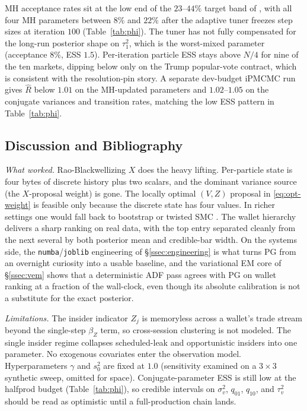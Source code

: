MH acceptance rates sit at the low end of the $23$--$44\%$ target band of \citet[Ch. 4.2.2]{sanzalonso2025notes}, with all four MH parameters between $8\%$ and $22\%$ after the adaptive tuner freezes step sizes at iteration $100$ (Table~\ref{tab:phi}). The tuner has not fully compensated for the long-run posterior shape on $\tau^2_1$, which is the worst-mixed parameter (acceptance $8\%$, ESS $1.5$). Per-iteration particle ESS stays above $N/4$ for nine of the ten markets, dipping below only on the Trump popular-vote contract, which is consistent with the resolution-pin story. A separate dev-budget iPMCMC run gives $\widehat R$ below $1.01$ on the MH-updated parameters and $1.02$--$1.05$ on the conjugate variances and transition rates, matching the low ESS pattern in Table~\ref{tab:phi}.

\subsection{Discussion and Bibliography}\label{ssec:discussion}

\emph{What worked.} Rao-Blackwellizing $X$ does the heavy lifting. Per-particle state is four bytes of discrete history plus two scalars, and the dominant variance source (the $X$-proposal weight) is gone. The locally optimal $(V,Z)$ proposal in \eqref{eq:opt-weight} is feasible only because the discrete state has four values. In richer settings one would fall back to bootstrap or twisted SMC \citep{heng2020controlled}. The wallet hierarchy delivers a sharp ranking on real data, with the top entry separated cleanly from the next several by both posterior mean and credible-bar width. On the systems side, the \texttt{numba}/\texttt{joblib} engineering of \S\ref{ssec:engineering} is what turns PG from an overnight curiosity into a usable baseline, and the variational EM core of \S\ref{ssec:vem} shows that a deterministic ADF pass agrees with PG on wallet ranking at a fraction of the wall-clock, even though its absolute calibration is not a substitute for the exact posterior.

\emph{Limitations.} The insider indicator $Z_j$ is memoryless across a wallet's trade stream beyond the single-step $\beta_Z$ term, so cross-session clustering is not modeled. The single insider regime collapses scheduled-leak and opportunistic insiders into one parameter. No exogenous covariates enter the observation model. Hyperparameters $\gamma$ and $s_0^2$ are fixed at $1.0$ (sensitivity examined on a $3 \times 3$ synthetic sweep, omitted for space). Conjugate-parameter ESS is still low at the halfprod budget (Table~\ref{tab:phi}), so credible intervals on $\sigma^2_v$, $q_{01}$, $q_{10}$, and $\tau^2_v$ should be read as optimistic until a full-production chain lands.

